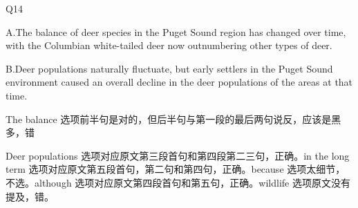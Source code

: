 \begin{blk}
    \begin{qst}
        Q14
    \end{qst}

    \begin{chc}
        A.The balance of deer species in the Puget Sound region has changed over time, with the Columbian white-tailed deer now outnumbering other types of deer.

        B.Deer populations naturally fluctuate, but early settlers in the Puget Sound environment caused an overall decline in the deer populations of the areas at that time.
    \end{chc}

    \begin{nlz}
        The balance 选项前半句是对的，但后半句与第一段的最后两句说反，应该是黑多，错

        Deer populations 选项对应原文第三段首句和第四段第二三句，正确。in the long term 选项对应原文第五段首句，第二句和第四句，正确。because 选项太细节，不选。although 选项对应原文第四段首句和第五句，正确。wildlife 选项原文没有提及，错。
    \end{nlz}
\end{blk}
